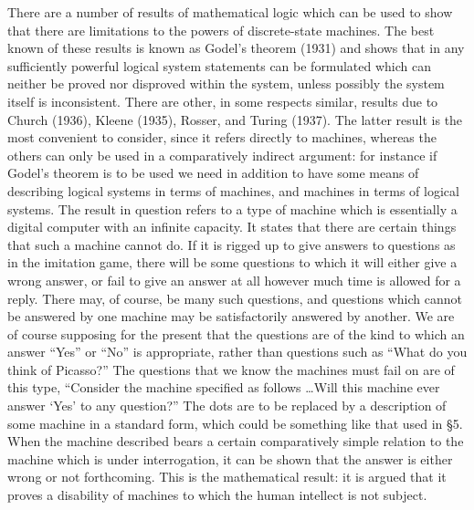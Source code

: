 \documentclass[10pt,twoside,openright]{memoir}
\begin{document}
There are a number of results of mathematical logic which can be used to show that there are limitations to the powers of discrete-state machines. The best known of these results is known as Godel's theorem (1931) and shows that in any sufficiently powerful logical system statements can be formulated which can neither be proved nor disproved within the system, unless possibly the system itself is inconsistent. There are other, in some respects similar, results due to Church (1936), Kleene (1935), Rosser, and Turing (1937). The latter result is the most convenient to consider, since it refers directly to machines, whereas the others can only be used in a comparatively indirect argument: for instance if Godel's theorem is to be used we need in addition to have some means of describing logical systems in terms of machines, and machines in terms of logical systems. The result in question refers to a type of machine which is essentially a digital computer with an infinite capacity. It states that there are certain things that such a machine cannot do. If it is rigged up to give answers to questions as in the imitation game, there will be some questions to which it will either give a wrong answer, or fail to give an answer at all however much time is allowed for a reply. There may, of course, be many such questions, and questions which cannot be answered by one machine may be satisfactorily answered by another. We are of course supposing for the present that the questions are of the kind to which an answer ``Yes'' or ``No'' is appropriate, rather than questions such as ``What do you think of Picasso?'' The questions that we know the machines must fail on are of this type, ``Consider the machine specified as follows \dots Will this machine ever answer `Yes' to any question?'' The dots are to be replaced by a description of some machine in a standard form, which could be something like that used in \S5. When the machine described bears a certain comparatively simple relation to the machine which is under interrogation, it can be shown that the answer is either wrong or not forthcoming. This is the mathematical result: it is argued that it proves a disability of machines to which the human intellect is not subject.
\end{document}
